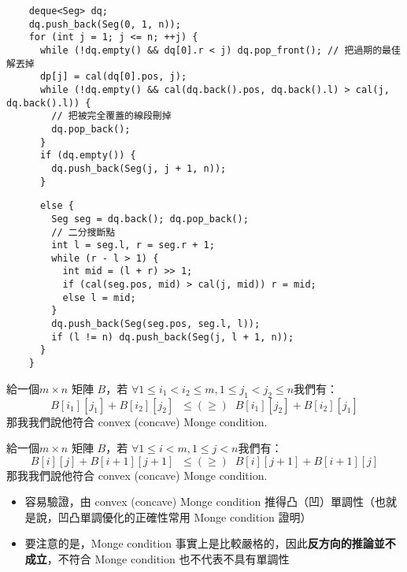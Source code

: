 \documentclass[standalone]{beamer}
\begin{document}
\begin{frame}[fragile]{}
  \begin{verbatim}
    deque<Seg> dq;
    dq.push_back(Seg(0, 1, n));
    for (int j = 1; j <= n; ++j) {
      while (!dq.empty() && dq[0].r < j) dq.pop_front(); // 把過期的最佳解丟掉
      dp[j] = cal(dq[0].pos, j);
      while (!dq.empty() && cal(dq.back().pos, dq.back().l) > cal(j, dq.back().l)) {
        // 把被完全覆蓋的線段刪掉
        dq.pop_back();
      }
      if (dq.empty()) {
        dq.push_back(Seg(j, j + 1, n));
      }
  \end{verbatim}
\end{frame}

\begin{frame}[fragile]{}
  \begin{verbatim}
      else {
        Seg seg = dq.back(); dq.pop_back();
        // 二分搜斷點
        int l = seg.l, r = seg.r + 1;
        while (r - l > 1) {
          int mid = (l + r) >> 1;
          if (cal(seg.pos, mid) > cal(j, mid)) r = mid;
          else l = mid;
        }
        dq.push_back(Seg(seg.pos, seg.l, l));
        if (l != n) dq.push_back(Seg(j, l + 1, n));
      }
    }
  \end{verbatim}
\end{frame}

\begin{frame}{}
  \begin{theorem}
    給一個$m \times n$ 矩陣 $B$，若 $\forall 1\leq i_1<i_2 \leq m, 1\leq j_1<j_2\leq n$我們有：
    $$B[i_1][j_1]+B[i_2][j_2] \;\;\leq (\geq)\;\; B[i_1][j_2]+B[i_2][j_1]$$
    那我我們說他符合 convex (concave) Monge condition.
  \end{theorem}
  \begin{theorem}
    給一個$m \times n$ 矩陣 $B$，若 $\forall 1\leq i<m, 1\leq j< n$我們有：
    $$B[i][j]+B[i+1][j+1] \;\;\leq (\geq)\;\; B[i][j+1]+B[i+1][j]$$
    那我我們說他符合 convex (concave) Monge condition.
  \end{theorem}
\end{frame}

\begin{frame}{}
  \begin{itemize}
    \item 容易驗證，由 convex (concave) Monge condition 推得凸（凹）單調性（也就是說，凹凸單調優化的正確性常用 Monge condition 證明）
    \item 要注意的是，Monge condition 事實上是比較嚴格的，因此\textbf{反方向的推論並不成立}，不符合 Monge condition 也不代表不具有單調性
  \end{itemize}
\end{frame}
\end{document}
